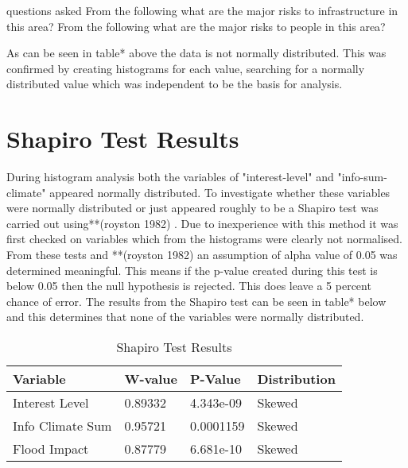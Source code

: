 questions asked From the following what are the major risks to infrastructure in this area?
From the following what are the major risks to people in this area?

As can be seen in table* above the data is not normally distributed. This was confirmed by creating histograms for each value, searching for a normally distributed value which was independent to be the basis for analysis. 

\newpage

\section{Shapiro Test Results}

During histogram analysis both the variables of "interest-level" and "info-sum-climate" appeared normally distributed. To investigate whether these variables were normally distributed or just appeared roughly to be a Shapiro test was carried out using**(royston 1982) . Due to inexperience with this method it was first checked on variables which from the histograms were clearly not normalised. From these tests and **(royston 1982) an assumption of alpha value of 0.05 was determined meaningful. This means if the p-value created during this test is below 0.05 then the null hypothesis is rejected. This does leave a 5 percent chance of error. The results from the Shapiro test can be seen in table* below and this determines that none of the variables were normally distributed. 

\begin{table}[!ht]
    \centering
    \begin{tabular}{|l|l|l|l|}
    \hline
         Variable & W-value & P-Value & Distribution \\ \hline
       Interest Level & 0.89332 & 4.343e-09 & Skewed \\ \hline
         Info Climate Sum  & 0.95721 & 0.0001159 & Skewed \\ \hline
        Flood Impact & 0.87779 & 6.681e-10 & Skewed \\ \hline
     \end{tabular}
    \caption{Shapiro Test Results}
    \label{table:shapiro_test_results}
\end{table}

